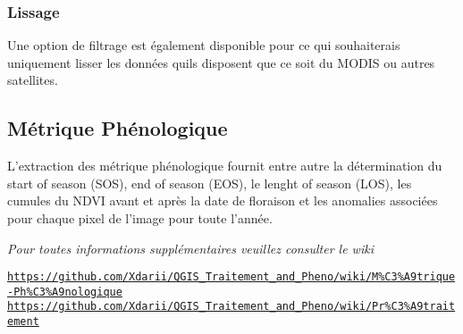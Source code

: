 \subsubsection*{Lissage}

Une option de filtrage est également disponible pour ce qui souhaiterais uniquement lisser les données qu\textquotesingle{}ils disposent que ce soit du M\+O\+D\+IS ou autres satellites.

\subsection*{Métrique Phénologique}

L’extraction des métrique phénologique fournit entre autre la détermination du start of season (S\+OS), end of season (E\+OS), le lenght of season (L\+OS), les cumules du N\+D\+VI avant et après la date de floraison et les anomalies associées pour chaque pixel de l’image pour toute l’année.

{\itshape Pour toutes informations supplémentaires veuillez consulter le wiki}

\href{https://github.com/Xdarii/QGIS_Traitement_and_Pheno/wiki/M%C3%A9trique-Ph%C3%A9nologique}{\tt https\+://github.\+com/\+Xdarii/\+Q\+G\+I\+S\+\_\+\+Traitement\+\_\+and\+\_\+\+Pheno/wiki/\+M\%\+C3\%\+A9trique-\/\+Ph\%\+C3\%\+A9nologique} \href{https://github.com/Xdarii/QGIS_Traitement_and_Pheno/wiki/Pr%C3%A9traitement}{\tt https\+://github.\+com/\+Xdarii/\+Q\+G\+I\+S\+\_\+\+Traitement\+\_\+and\+\_\+\+Pheno/wiki/\+Pr\%\+C3\%\+A9traitement} 